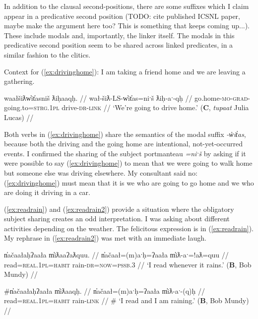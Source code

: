 In addition to the clausal second-positions, there are some suffixes which I claim appear in a predicative second position (TODO: cite published ICSNL paper, maybe make the argument here too? This is something that keeps coming up...). These include modals and, importantly, the linker itself. The modals in this predicative second position seem to be shared across linked predicates, in a similar fashion to the clitics.

\vspace{5pt}

\noindent Context for (\ref{ex:drivinghome}): I am taking a friend home and we are leaving a gathering.

\ex \label{ex:drivinghome}
\begingl
\glpreamble waałšiƛw̓it̓asniš ƛiḥaaqḥ. //
\gla wał-šiƛ-LS-w̓it̓as=niˑš ƛiḥ-aˑ-qḥ //
\glb go.home-\textsc{mo}-\textsc{grad}-going.to=\textsc{strg.1pl} drive-\textsc{dr}-\textsc{link} //
\glft `We're going to drive home.' (\textbf{C}, \textit{tupaat} Julia Lucas) //
\endgl
\xe

Both verbs in (\ref{ex:drivinghome}) share the semantics of the modal suffix \textit{-w̓it̓as}, because both the driving and the going home are intentional, not-yet-occurred events. I confirmed the sharing of the subject portmanteau \textit{=niˑš} by asking if it were possible to say (\ref{ex:drivinghome}) to mean that we were going to walk home but someone else was driving elsewhere. My consultant said no: (\ref{ex:drivinghome}) must mean that it is we who are going to go home and we who are doing it driving in a car.

(\ref{ex:readrain}) and (\ref{ex:readrain2}) provide a situation where the obligatory subject sharing creates an odd interpretation. I was asking about different activities depending on the weather. The felicitous expression is in (\ref{ex:readrain}). My rephrase in (\ref{ex:readrain2}) was met with an immediate laugh.

\ex \label{ex:readrain}
\begingl
\glpreamble n̓ačaałaḥʔaała m̓iƛaaʔaƛquu. //
\gla n̓ačaał=(m)aˑḥ=ʔaała m̓iƛ-aˑ=!aƛ=quu //
\glb read=\textsc{real.1pl}=\textsc{habit} rain-\textsc{dr}=\textsc{now}=\textsc{pssb.3} //
\glft `I read whenever it rains.' (\textbf{B}, Bob Mundy) //
\endgl
\xe

\ex \label{ex:readrain2}
\begingl
\glpreamble \#n̓ačaałaḥʔaała m̓iƛaaqḥ. //
\gla n̓ačaał=(m)aˑḥ=ʔaała m̓iƛ-aˑ-(q)ḥ //
\glb read=\textsc{real.1pl}=\textsc{habit} rain-\textsc{link} //
\glft \# `I read and I am raining.' (\textbf{B}, Bob Mundy) //
\endgl
\xe

